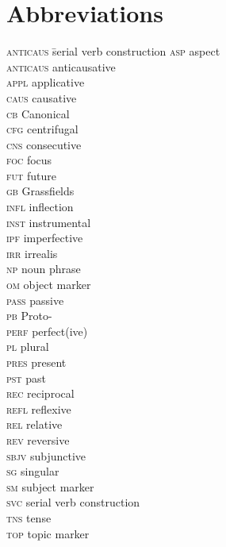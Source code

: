 \documentclass[output=paper]{langsci/langscibook}
\begin{document}
\section*{Abbreviations}\largerpage
\begin{multicols}{2}
\begin{tabbing}
\textsc{anticaus}\hspace{.25em} \= {serial verb construction}\kill
\textsc{asp} \> aspect            \\
\textsc{anticaus} \> anticausative \\
\textsc{appl} \> {applicative}       \\ 
\textsc{caus} \> {causative}         \\ 
\textsc{cb} \> Canonical      \\ 
\textsc{cfg} \> centrifugal        \\ 
\textsc{cns} \> consecutive        \\ 
\textsc{foc} \> focus              \\ 
\textsc{fut} \> future             \\ 
\textsc{gb} \> Grassfields    \\ 
\textsc{infl} \> inflection       \\
\textsc{inst} \> instrumental     \\
\textsc{ipf} \> {imperfective}      \\
\textsc{irr} \> irrealis          \\
\textsc{np} \> noun phrase        \\
\textsc{om} \> object marker      \\
\textsc{pass} \> passive          \\
\textsc{pb} \> Proto-        \\
\textsc{perf} \> perfect(ive)     \\
\textsc{pl} \> plural             \\
\textsc{pres} \> present          \\
\textsc{pst} \> past\\
\textsc{rec} \> reciprocal\\
\textsc{refl} \> reflexive\\
\textsc{rel} \> relative\\
\textsc{rev} \> reversive\\
\textsc{sbjv} \> {subjunctive}\\
\textsc{sg} \> singular\\
\textsc{sm} \> subject marker\\
\textsc{svc} \> {serial verb} construction\\
\textsc{tns} \> {tense}\\
\textsc{top} \> topic marker
\end{tabbing} 
\end{multicols} 

{\sloppy
\printbibliography[heading=subbibliography,notkeyword=this]
}
\end{document}
